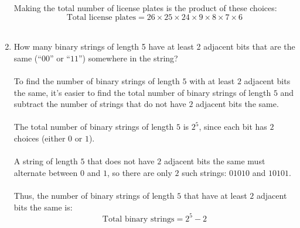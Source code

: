 \documentclass{amsart}
\theoremstyle{definition}
\theoremstyle{Exercise}
\theoremstyle{remark}
\theoremstyle{rule}
\numberwithin{equation}{section}
\begin{document}
\begin{enumerate}[label=(\alph*)]
Making the total number of license plates is the product of these choices:
\[
\text{Total license plates} = 26 \times 25 \times 24 \times 9 \times 8 \times 7 \times 6
\]
\\
    \item How many binary strings of length 5 have at least 2 adjacent bits that are the same (``$00$'' or ``$11$'') somewhere in the string?
\\\\
To find the number of binary strings of length \(5\) with at least \(2\) adjacent bits the same, it's easier to find the total number of binary strings of length \(5\) and subtract the number of strings that do not have \(2\) adjacent bits the same.\\\\
The total number of binary strings of length \(5\) is \(2^5\), since each bit has \(2\) choices (either \(0\) or \(1\)).\\\\
A string of length \(5\) that does not have \(2\) adjacent bits the same must alternate between \(0\) and \(1\), so there are only \(2\) such strings: \(01010\) and \(10101\).\\\\
Thus, the number of binary strings of length \(5\) that have at least \(2\) adjacent bits the same is: 
\[
\text{Total binary strings} = 2^5 - 2
\]
\\
  \end{enumerate}
\newpage
  \section*{}
  \section*{}
\end{document}

